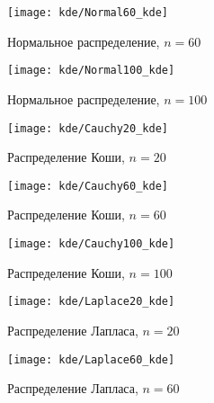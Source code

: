 \begin{figure}[H]
	\begin{center}
		\texttt{[image: kde/Normal60\_kde]}
		\caption{Нормальное распределение, $n=60$} 
		\label{pic:pic_name} 
	\end{center}
\end{figure}

\begin{figure}[H]
	\begin{center}
		\texttt{[image: kde/Normal100\_kde]}
		\caption{Нормальное распределение, $n=100$} 
		\label{pic:pic_name} 
	\end{center}
\end{figure}

\begin{figure}[H]
	\begin{center}
		\texttt{[image: kde/Cauchy20\_kde]}
		\caption{Распределение Коши, $n=20$} 
		\label{pic:pic_name} 
	\end{center}
\end{figure}

\begin{figure}[H]
	\begin{center}
		\texttt{[image: kde/Cauchy60\_kde]}
		\caption{Распределение Коши, $n=60$} 
		\label{pic:pic_name} 
	\end{center}
\end{figure}

\begin{figure}[H]
	\begin{center}
		\texttt{[image: kde/Cauchy100\_kde]}
		\caption{Распределение Коши, $n=100$} 
		\label{pic:pic_name} 
	\end{center}
\end{figure}

\begin{figure}[H]
	\begin{center}
		\texttt{[image: kde/Laplace20\_kde]}
		\caption{Распределение Лапласа, $n=20$} 
		\label{pic:pic_name} 
	\end{center}
\end{figure}

\begin{figure}[H]
	\begin{center}
		\texttt{[image: kde/Laplace60\_kde]}
		\caption{Распределение Лапласа, $n=60$} 
		\label{pic:pic_name} 
	\end{center}
\end{figure}

